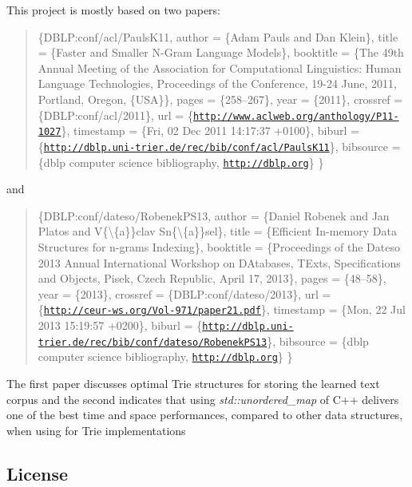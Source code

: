 This project is mostly based on two papers\+: \begin{quote}
\{D\+B\+L\+P\+:conf/acl/\+Pauls\+K11, author = \{Adam Pauls and Dan Klein\}, title = \{Faster and Smaller N-\/\+Gram Language Models\}, booktitle = \{The 49th Annual Meeting of the Association for Computational Linguistics\+: Human Language Technologies, Proceedings of the Conference, 19-\/24 June, 2011, Portland, Oregon, \{U\+S\+A\}\}, pages = \{258--267\}, year = \{2011\}, crossref = \{D\+B\+L\+P\+:conf/acl/2011\}, url = \{\href{http://www.aclweb.org/anthology/P11-1027}{\tt http\+://www.\+aclweb.\+org/anthology/\+P11-\/1027}\}, timestamp = \{Fri, 02 Dec 2011 14\+:17\+:37 +0100\}, biburl = \{\href{http://dblp.uni-trier.de/rec/bib/conf/acl/PaulsK11}{\tt http\+://dblp.\+uni-\/trier.\+de/rec/bib/conf/acl/\+Pauls\+K11}\}, bibsource = \{dblp computer science bibliography, \href{http://dblp.org}{\tt http\+://dblp.\+org}\} \} \end{quote}


and

\begin{quote}
\{D\+B\+L\+P\+:conf/dateso/\+Robenek\+P\+S13, author = \{Daniel Robenek and Jan Platos and V\{\textbackslash{}\textquotesingle{}\{a\}\}clav Sn\{\textbackslash{}\textquotesingle{}\{a\}\}sel\}, title = \{Efficient In-\/memory Data Structures for n-\/grams Indexing\}, booktitle = \{Proceedings of the Dateso 2013 Annual International Workshop on D\+Atabases, T\+Exts, Specifications and Objects, Pisek, Czech Republic, April 17, 2013\}, pages = \{48--58\}, year = \{2013\}, crossref = \{D\+B\+L\+P\+:conf/dateso/2013\}, url = \{\href{http://ceur-ws.org/Vol-971/paper21.pdf}{\tt http\+://ceur-\/ws.\+org/\+Vol-\/971/paper21.\+pdf}\}, timestamp = \{Mon, 22 Jul 2013 15\+:19\+:57 +0200\}, biburl = \{\href{http://dblp.uni-trier.de/rec/bib/conf/dateso/RobenekPS13}{\tt http\+://dblp.\+uni-\/trier.\+de/rec/bib/conf/dateso/\+Robenek\+P\+S13}\}, bibsource = \{dblp computer science bibliography, \href{http://dblp.org}{\tt http\+://dblp.\+org}\} \} \end{quote}


The first paper discusses optimal Trie structures for storing the learned text corpus and the second indicates that using {\itshape std\+::unordered\+\_\+map} of C++ delivers one of the best time and space performances, compared to other data structures, when using for Trie implementations

\subsection*{License}

